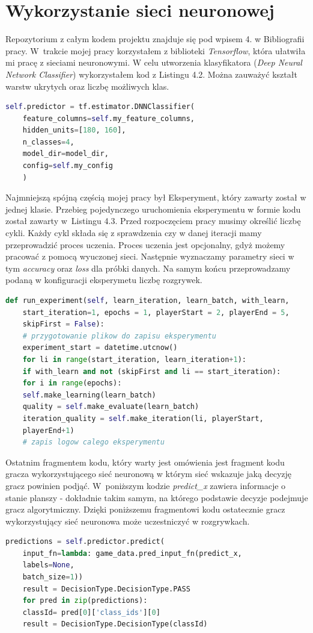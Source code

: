 \documentclass[12pt, oneside]{report}
\begin{document}
	\section{Wykorzystanie sieci neuronowej}
	Repozytorium z całym kodem projektu znajduje się pod wpisem 4. w Bibliografii pracy.
	W~trakcie mojej pracy korzystałem z biblioteki \textit{Tensorflow}, która ułatwiła mi pracę z sieciami 
	neuronowymi. W celu utworzenia klasyfikatora (\textit{Deep Neural Network Classifier}) wykorzystałem kod z Listingu 4.2. Można zauważyć kształt warstw ukrytych oraz liczbę możliwych klas.
	
	\begin{lstlisting}[frame=single, language=Python, caption=Konfiguracja klasyfikatora]
	self.predictor = tf.estimator.DNNClassifier(
	feature_columns=self.my_feature_columns,
	hidden_units=[180, 160],
	n_classes=4,
	model_dir=model_dir,
	config=self.my_config
	)
	\end{lstlisting}
	
	Najmniejszą spójną częścią mojej pracy był Eksperyment, który zawarty został w jednej klasie. Przebieg pojedynczego uruchomienia eksperymentu w formie kodu został zawarty w~Listingu 4.3. Przed rozpoczęciem pracy musimy określić liczbę cykli. Każdy cykl składa się z sprawdzenia czy w danej iteracji mamy przeprowadzić proces uczenia. Proces uczenia jest opcjonalny, gdyż możemy pracować z pomocą wyuczonej sieci. Następnie wyznaczamy parametry sieci w tym \textit{accuracy} oraz \textit{loss} dla próbki danych. Na samym końcu przeprowadzamy podaną w konfiguracji eksperymetu liczbę rozgrywek. 
	\begin{lstlisting}[frame=single, language=Python, caption=Funkcja przeprowadzająca pojedynczy eksperyment]
	def run_experiment(self, learn_iteration, learn_batch, with_learn, 
	start_iteration=1, epochs = 1, playerStart = 2, playerEnd = 5, 
	skipFirst = False):
	# przygotowanie plikow do zapisu eksperymentu
	experiment_start = datetime.utcnow()
	for li in range(start_iteration, learn_iteration+1):
	if with_learn and not (skipFirst and li == start_iteration):
	for i in range(epochs):
	self.make_learning(learn_batch)
	quality = self.make_evaluate(learn_batch)
	iteration_quality = self.make_iteration(li, playerStart,
	playerEnd+1)
	# zapis logow calego eksperymentu
	\end{lstlisting}
	
	Ostatnim fragmentem kodu, który warty jest omówienia jest fragment kodu gracza wykorzystującego sieć neuronową w którym sieć wskazuje jaką decyzję gracz powinien podjąć. W~poniższym kodzie \textit{predict\_x} zawiera informacje o stanie planszy - dokładnie takim samym, na którego podstawie decyzje podejmuje gracz algorytmiczny. Dzięki poniższemu fragmentowi kodu ostatecznie gracz wykorzystujący sieć neuronowa może uczestniczyć w rozgrywkach. 
	\begin{lstlisting}[frame=single, language=Python, caption=Wyznaczenie klasy decyzji]
	predictions = self.predictor.predict(
	input_fn=lambda: game_data.pred_input_fn(predict_x,
	labels=None,
	batch_size=1))
	result = DecisionType.DecisionType.PASS
	for pred in zip(predictions):
	classId= pred[0]['class_ids'][0]
	result = DecisionType.DecisionType(classId)
	\end{lstlisting}
	
\end{document}
